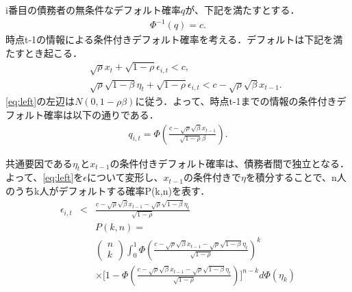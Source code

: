 \documentclass[dvipdfmx]{beamer}
\begin{document}
\begin{frame}
i番目の債務者の無条件なデフォルト確率$q$が、下記を満たすとする．
\begin{eqnarray}
\Phi^{-1}(q)=c.\nonumber
\end{eqnarray}
時点t-1の情報による条件付きデフォルト確率を考える．デフォルトは下記を満たすとき起こる．
\begin{eqnarray}
&&\sqrt{\rho}x_t+\sqrt{1-\rho}\epsilon_{i,t}<c,\nonumber\\
&&\sqrt{\rho}\sqrt{1-\beta}\eta_t+\sqrt{1-\rho}\epsilon_{i,t}<c-\sqrt{\rho}\sqrt{\beta}x_{t-1}.
\label{eq:left}
\end{eqnarray}
\eqref{eq:left}の左辺は$N(0,1-\rho\beta)$に従う．よって、時点t-1までの情報の条件付きデフォルト確率は以下の通りである．
\begin{eqnarray}
q_{i,t}=\Phi(\frac{c-\sqrt{\rho}\sqrt{\beta}x_{t-1}}{\sqrt{1-\rho}\beta}).\nonumber
\end{eqnarray}
\end{frame}

\begin{frame}
共通要因である$\eta_t$と$x_{t-1}$の条件付きデフォルト確率は、債務者間で独立となる．よって、\eqref{eq:left}を$\epsilon$について変形し、$x_{t-1}$の条件付きで$\eta$を積分することで、n人のうちk人がデフォルトする確率P(k,n)を表す．
\begin{eqnarray}
\epsilon_{i,t}&<&
\frac{c-\sqrt{\rho}\sqrt{\beta}x_{t-1}-\sqrt{\rho}\sqrt{1-\beta}\eta_t}
{\sqrt{1-\rho}}\nonumber\\
&&P(k,n)=\nonumber\\
&&
\begin{pmatrix}
n\\
k
\end{pmatrix}
\int_{0}^{1}\Phi(\frac{c-\sqrt{\rho}\sqrt{\beta}x_{t-1}-\sqrt{\rho}\sqrt{1-\beta}\eta_t}{\sqrt{1-\rho}})^k\nonumber\\
&&\times \bigl[
1-
\Phi(
\frac{c-\sqrt{\rho}\sqrt{\beta}x_{t-1}-\sqrt{\rho}\sqrt{1-\beta}\eta_t}{\sqrt{1-\rho}}
)
\bigr]^{n-k}d\Phi(\eta_k)
\label{eq:tt}
\end{eqnarray}
\end{frame}
\end{document}
